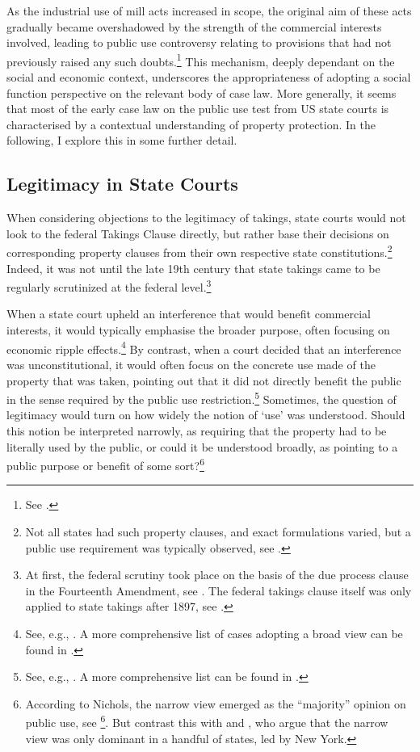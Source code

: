 As the industrial use of mill acts increased in scope, the original aim of these acts gradually became overshadowed by the strength of the commercial interests involved, leading to public use controversy relating to provisions that had not previously raised any such doubts.\footnote{See \cite{head86}.} This mechanism, deeply dependant on the social and economic context, underscores the appropriateness of adopting a social function perspective on the relevant body of case law. More generally, it seems that most of the early case law on the public use test from US state courts is characterised by a contextual understanding of property protection. In the following, I explore this in some further detail.

\subsection{Legitimacy in State Courts}\label{subsec:state}

When considering objections to the legitimacy of takings, state courts would not look to the federal Takings Clause directly, but rather base their decisions on corresponding property clauses from their own respective state constitutions.\footnote{Not all states had such property clauses, and exact formulations varied, but a public use requirement was typically observed, see \cite[293-296]{johnson11}.} Indeed, it was not until the late 19th century that state takings came to be regularly scrutinized at the federal level.\footnote{At first, the federal scrutiny took place on the basis of the due process clause in the Fourteenth Amendment, see \cite{head75}. The federal takings clause itself was only applied to state takings after 1897, see \cite{chicago97}.}

When a state court upheld an interference that would benefit commercial interests, it would typically emphasise the broader purpose, often focusing on economic ripple effects.\footnote{See, e.g., \cite{hazen53,scudder32,boston32}. A more comprehensive list of cases adopting a broad view can be found in \cite[617]{nichols40}.} By contrast, when a court decided that an interference was unconstitutional, it would often focus on the concrete use made of the property that was taken,  pointing out that it did not directly benefit the public in the sense required by the public use restriction.\footnote{See, e.g., \cite{sadler59,ryerson77,gaylord03,minn06}. A more comprehensive list can be found in \cite{alr28}.} Sometimes, the question of legitimacy would turn on how widely the notion of `use' was understood. Should this notion be interpreted narrowly, as requiring that the property had to be literally used by the public, or could it be understood broadly, as pointing to a public purpose or benefit of some sort?\footnote{According to Nichols, the narrow view emerged as the ``majority'' opinion on public use, see \footcite[617-618]{nichols40}. But contrast this with \cite{berger78} and \cite[24]{meidinger80}, who argue that the narrow view was only dominant in a handful of states, led by New York.}

